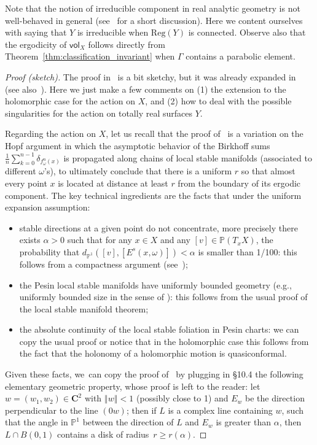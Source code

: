 \documentclass[11pt]{article}
\newcommand{\eg}{e.g.,\xspace}
\newcommand{\norm}[1]{{\left\Vert#1\right\Vert}}
\newcommand{\unsur}[1]{\frac{1}{#1}}
\newcommand{\lrpar}[1]{\left(#1\right)}
\newcommand{\pp}{\mathbb{P}}\let\P\pp
\def\C{\mathbf{C}}
\newcommand{\vol}{{\mathsf{vol}}}
\theoremstyle{plain}
\theoremstyle{definition}
\numberwithin{equation}{section}
\begin{document}
Note that the notion of irreducible component in real analytic geometry is not well-behaved in general
(see~\cite[\S 5.1]{invariant} for a short discussion).
Here we content ourselves with saying that $Y$ is irreducible when $\mathrm{Reg}(Y)$ is connected.
Observe also that the ergodicity of
$\vol_X$ follows directly from Theorem~\ref{thm:classification_invariant} when $\Gamma$
contains a parabolic element.

\begin{proof}[Proof (sketch)]
The proof in~\cite{dolgopyat-krikorian} is a bit sketchy, but it was already
expanded in~\cite{liu_thesis, chung} (see also~\cite{zzhang}).
Here we just make a few comments on (1) the extension to the holomorphic case for the action on $X$,
and (2) how to deal with the possible singularities for the action on totally real surfaces $Y$.

Regarding the action on $X$, let us recall that the proof of~\cite{dolgopyat-krikorian} is a
variation on the Hopf argument in which the asymptotic behavior of the Birkhoff
sums $ \unsur{n}\sum_{k=0}^{n-1} \delta_{f_\omega^n(x)}$ is propagated along chains of
local stable manifolds (associated to different $\omega$'s), to ultimately conclude that there
is a uniform $r$ so that almost every point $x$
is located at distance at least $r$ from the boundary of its ergodic component.
The key technical ingredients are the facts that under the uniform expansion assumption:
\begin{itemize}
\item stable directions at a given point do not concentrate, more precisely there exists
$\alpha>0$ such that for any $x\in X$ and any $[v]\in \pp(T_x X)$, the probability that
$d_{\P^1}\lrpar{[v], [E^s(x,\omega) ]} <\alpha$ is smaller than 1/100: this follows from a compactness argument
(see~\cite[Prop.\,4.4.4]{liu_thesis});
\item the Pesin local stable manifolds have uniformly bounded geometry
(\eg uniformly bounded size in the sense of
\cite[\S 7.4]{stiffness}): this follows from the usual proof of the local stable manifold theorem;
\item the absolute continuity of the local stable foliation in Pesin charts: we can copy the usual proof
or notice that in the holomorphic case this follows from the fact that the holonomy of a holomorphic
motion is quasiconformal.
\end{itemize}
Given these facts, we~can copy the proof of~\cite{dolgopyat-krikorian} by plugging in \S 10.4
the following elementary geometric property, whose proof is left to the reader:
let $w = (w_1, w_2)\in \C^2$ with $\norm{w}<1$ (possibly close to 1)
and $E_w$ be the direction perpendicular to the line $(0w)$; then if
$L$ is a complex line containing $w$, such that the angle in $\P^1$
between the direction of
$L$ and $E_w$ is greater than $\alpha$, then $L\cap B(0, 1)$ contains a disk of radius~$r\geq r(\alpha)$.


\end{proof}
\end{document}
